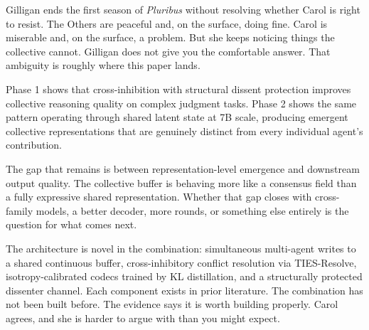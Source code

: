 \documentclass[10pt,twocolumn]{article}
\begin{document}
Gilligan ends the first season of \textit{Pluribus} without resolving whether Carol is right to resist. The Others are peaceful and, on the surface, doing fine. Carol is miserable and, on the surface, a problem. But she keeps noticing things the collective cannot. Gilligan does not give you the comfortable answer. That ambiguity is roughly where this paper lands.

Phase 1 shows that cross-inhibition with structural dissent protection improves collective reasoning quality on complex judgment tasks. Phase 2 shows the same pattern operating through shared latent state at 7B scale, producing emergent collective representations that are genuinely distinct from every individual agent's contribution.

The gap that remains is between representation-level emergence and downstream output quality. The collective buffer is behaving more like a consensus field than a fully expressive shared representation. Whether that gap closes with cross-family models, a better decoder, more rounds, or something else entirely is the question for what comes next.

The architecture is novel in the combination: simultaneous multi-agent writes to a shared continuous buffer, cross-inhibitory conflict resolution via TIES-Resolve, isotropy-calibrated codecs trained by KL distillation, and a structurally protected dissenter channel. Each component exists in prior literature. The combination has not been built before. The evidence says it is worth building properly. Carol agrees, and she is harder to argue with than you might expect.



\end{document}
